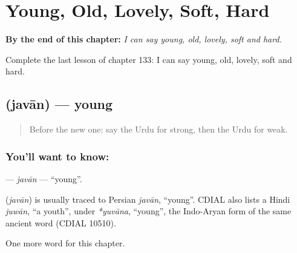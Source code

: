 
\chapter{Young, Old, Lovely, Soft, Hard}
\label{ch:ur-young-old-lovely-soft-hard}

\begin{chapteropening}
\textbf{By the end of this chapter:} \emph{I can say young, old, lovely, soft and hard.}

Complete the last lesson of chapter 133: I can say young, old, lovely, soft and hard.
\end{chapteropening}

\section[\texorpdfstring{\ur{جوان} (javān)}{جوان (javān)}]{ (javān) — young}

\label{lesson:UR-C133-javan}



\begin{quote}
Before the new one: say the Urdu for strong, then the Urdu for weak.
\end{quote}

\subsection*{You'll want to know: }
\textbf{} — \emph{javān} — \textquotedblleft{}young\textquotedblright{}.

\begin{cousinweb}
\textbf{} (\emph{javān}) is usually traced to Persian \emph{javān}, \textquotedblleft{}young\textquotedblright{}. CDIAL also lists a Hindi \emph{juwān}, \textquotedblleft{}a youth\textquotedblright{}, under \emph{*yuvāna}, \textquotedblleft{}young\textquotedblright{}, the Indo-Aryan form of the same ancient word (CDIAL 10510).
\end{cousinweb}

\begin{grammarlens}[title={What you've built}]
One more word for this chapter.
\end{grammarlens}

